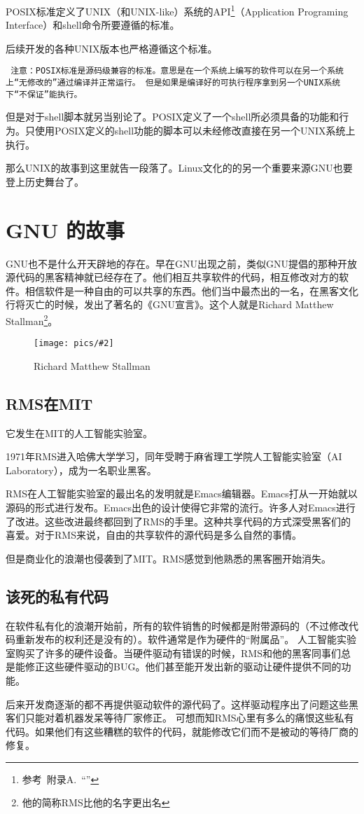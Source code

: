 \documentclass[amstex]{ctexbook}
\newenvironment{notice}{\tt}{}
\newenvironment{insertnote}{ \ttfamily\CJKfamily{KaiTi} }{\vskip 1cm }
\newcommand{\chatu}[3][0.35]{%
\begin{figure}[h]%
\centering%
\texttt{[image: pics/\#2]}%
\caption{#3\label{fig:#2}}%
\end{figure}%
}
\newcommand{\faqref}[1]{~附录A.\nameref{FAQ}~“\nameref{#1}”}
\begin{document}
POSIX标准定义了UNIX（和UNIX-like）系统的API\footnote{ 参考\faqref{API}}（Application Programing Interface）和shell命令所要遵循的标准。

后续开发的各种UNIX版本也严格遵循这个标准。

\begin{notice}
注意：POSIX标准是源码级兼容的标准。意思是在一个系统上编写的软件可以在另一个系统上“无修改的”通过编译并正常运行。
但是如果是编译好的可执行程序拿到另一个UNIX系统下“不保证”能执行。

但是对于shell脚本就另当别论了。POSIX定义了一个shell所必须具备的功能和行为。只使用POSIX定义的shell功能的脚本可以未经修改直接在另一个UNIX系统上执行。
\end{notice}

那么UNIX的故事到这里就告一段落了。Linux文化的的另一个重要来源GNU也要登上历史舞台了。

\section{GNU 的故事}

GNU也不是什么开天辟地的存在。早在GNU出现之前，类似GNU提倡的那种开放源代码的黑客精神就已经存在了。他们相互共享软件的代码，相互修改对方的软件。相信软件是一种自由的可以共享的东西。他们当中最杰出的一名，在黑客文化行将灭亡的时候，发出了著名的《GNU宣言》。这个人就是Richard Matthew Stallman\footnote{他的简称RMS比他的名字更出名}。

\chatu{rms-full-size}{Richard Matthew Stallman}

\subsection{RMS在MIT}

它发生在MIT的人工智能实验室。

1971年RMS进入哈佛大学学习，同年受聘于麻省理工学院人工智能实验室（AI Laboratory），成为一名职业黑客。

RMS在人工智能实验室的最出名的发明就是Emacs编辑器。Emacs打从一开始就以源码的形式进行发布。Emacs出色的设计使得它非常的流行。许多人对Emacs进行了改进。这些改进最终都回到了RMS的手里。这种共享代码的方式深受黑客们的喜爱。对于RMS来说，自由的共享软件的源代码是多么自然的事情。

但是商业化的浪潮也侵袭到了MIT。RMS感觉到他熟悉的黑客圈开始消失。

\begin{insertnote}
\subsection*{该死的私有代码}
在软件私有化的浪潮开始前，所有的软件销售的时候都是附带源码的（不过修改代码重新发布的权利还是没有的）。软件通常是作为硬件的“附属品”。
人工智能实验室购买了许多的硬件设备。当硬件驱动有错误的时候，RMS和他的黑客同事们总是能修正这些硬件驱动的BUG。他们甚至能开发出新的驱动让硬件提供不同的功能。

后来开发商逐渐的都不再提供驱动软件的源代码了。这样驱动程序出了问题这些黑客们只能对着机器发呆等待厂家修正。
可想而知RMS心里有多么的痛恨这些私有代码。如果他们有这些糟糕的软件的代码，就能修改它们而不是被动的等待厂商的修复。
\end{insertnote}
\end{document}
